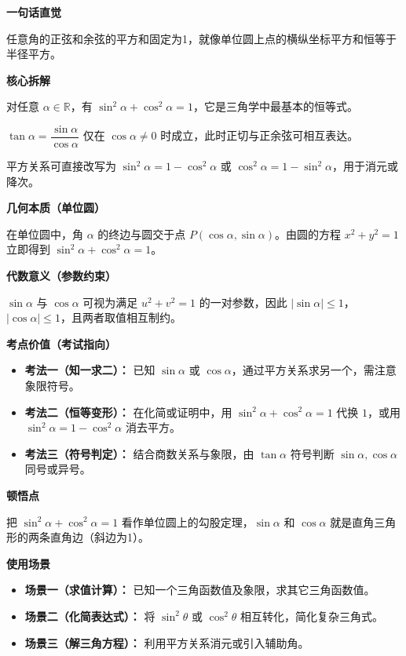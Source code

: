 \begin{explanationbox}
	\textbf{\textcolor{CExplanation}{一句话直觉}}

	任意角的正弦和余弦的平方和固定为1，就像单位圆上点的横纵坐标平方和恒等于半径平方。

	\medskip
	\textbf{\textcolor{CExplanation}{核心拆解}}
	\begin{description}[style=nextline, leftmargin=2.8em, labelsep=0.5em, itemsep=0.45em]
		\item[\textbf{要点一（平方恒等）：}] 对任意 $\alpha\in\mathbb{R}$，有 $\sin^2\alpha+\cos^2\alpha=1$，它是三角学中最基本的恒等式。
		\item[\textbf{要点二（商数条件）：}] $\tan\alpha=\dfrac{\sin\alpha}{\cos\alpha}$ 仅在 $\cos\alpha\neq0$ 时成立，此时正切与正余弦可相互表达。
		\item[\textbf{要点三（变形方向）：}] 平方关系可直接改写为 $\sin^2\alpha=1-\cos^2\alpha$ 或 $\cos^2\alpha=1-\sin^2\alpha$，用于消元或降次。
	\end{description}

	\medskip
	\textbf{\textcolor{CExplanation}{几何本质（单位圆）}}

	在单位圆中，角 $\alpha$ 的终边与圆交于点 $P(\cos\alpha,\sin\alpha)$。由圆的方程 $x^2+y^2=1$ 立即得到 $\sin^2\alpha+\cos^2\alpha=1$。

	\medskip
	\textbf{\textcolor{CExplanation}{代数意义（参数约束）}}

	$\sin\alpha$ 与 $\cos\alpha$ 可视为满足 $u^2+v^2=1$ 的一对参数，因此 $|\sin\alpha|\le1$，$|\cos\alpha|\le1$，且两者取值相互制约。

	\medskip
	\textbf{\textcolor{CExplanation}{考点价值（考试指向）}}
	\begin{itemize}[leftmargin=*, itemsep=0.5em, topsep=0.4em]
		\item \textbf{考法一（知一求二）：} 已知 $\sin\alpha$ 或 $\cos\alpha$，通过平方关系求另一个，需注意象限符号。
		\item \textbf{考法二（恒等变形）：} 在化简或证明中，用 $\sin^2\alpha+\cos^2\alpha=1$ 代换 $1$，或用 $\sin^2\alpha=1-\cos^2\alpha$ 消去平方。
		\item \textbf{考法三（符号判定）：} 结合商数关系与象限，由 $\tan\alpha$ 符号判断 $\sin\alpha,\cos\alpha$ 同号或异号。
	\end{itemize}

	\medskip
	\textbf{\textcolor{CExplanation}{顿悟点}}

	把 $\sin^2\alpha+\cos^2\alpha=1$ 看作单位圆上的勾股定理，$\sin\alpha$ 和 $\cos\alpha$ 就是直角三角形的两条直角边（斜边为1）。

	\medskip
	\textbf{\textcolor{CExplanation}{使用场景}}
	\begin{itemize}[leftmargin=*, itemsep=0.5em, topsep=0.4em]
		\item \textbf{场景一（求值计算）：} 已知一个三角函数值及象限，求其它三角函数值。
		\item \textbf{场景二（化简表达式）：} 将 $\sin^2\theta$ 或 $\cos^2\theta$ 相互转化，简化复杂三角式。
		\item \textbf{场景三（解三角方程）：} 利用平方关系消元或引入辅助角。
	\end{itemize}
\end{explanationbox}
